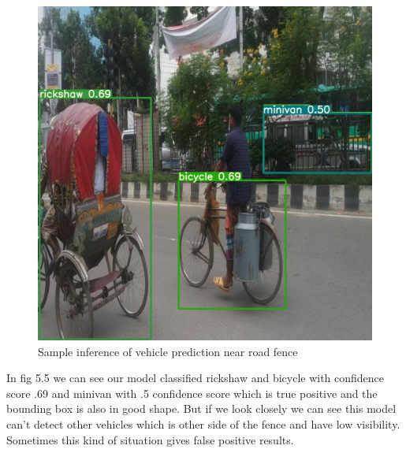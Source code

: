 \begin{figure}[h]
    \centering
    \includegraphics[max width=\textwidth]{images/ours/2.jpg}
   \caption{ Sample inference of vehicle prediction near road fence}
    \label{fig:inference345}
\end{figure}

\newpage
In fig 5.5 we can see our model classified rickshaw and bicycle with confidence score .69 and minivan with .5 confidence score which is true positive and the bounding box is also in good shape. But if we look closely we can see this model can't detect other vehicles which is other side of the fence and have low visibility. Sometimes this kind of situation gives false positive results. 

